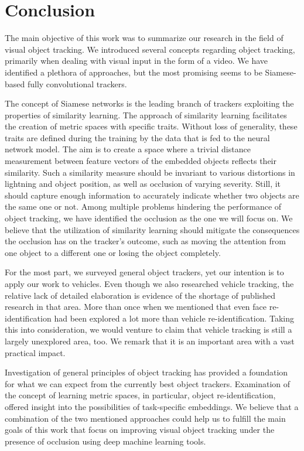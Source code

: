 \section{Conclusion}
\label{sec:Conclusion}

The main objective of this work was to summarize our research in the field of visual object tracking. We introduced several concepts regarding object tracking, primarily when dealing with visual input in the form of a video. We have identified a plethora of approaches, but the most promising seems to be Siamese-based fully convolutional trackers.

The concept of Siamese networks is the leading branch of trackers exploiting the properties of similarity learning. The approach of similarity learning facilitates the creation of metric spaces with specific traits. Without loss of generality, these traits are defined during the training by the data that is fed to the neural network model. The aim is to create a space where a trivial distance measurement between feature vectors of the embedded objects reflects their similarity. Such a similarity measure should be invariant to various distortions in lightning and object position, as well as occlusion of varying severity. Still, it should capture enough information to accurately indicate whether two objects are the same one or not. Among multiple problems hindering the performance of object tracking, we have identified the occlusion as the one we will focus on. We believe that the utilization of similarity learning should mitigate the consequences the occlusion has on the tracker's outcome, such as moving the attention from one object to a different one or losing the object completely.

For the most part, we surveyed general object trackers, yet our intention is to apply our work to vehicles. Even though we also researched vehicle tracking, the relative lack of detailed elaboration is evidence of the shortage of published research in that area. More than once when we mentioned that even face re-identification had been explored a lot more than vehicle re-identification. Taking this into consideration, we would venture to claim that vehicle tracking is still a largely unexplored area, too. We remark that it is an important area with a vast practical impact.

Investigation of general principles of object tracking has provided a foundation for what we can expect from the currently best object trackers. Examination of the concept of learning metric spaces, in particular, object re-identification, offered insight into the possibilities of task-specific embeddings. We believe that a combination of the two mentioned approaches could help us to fulfill the main goals of this work that focus on improving visual object tracking under the presence of occlusion using deep machine learning tools.
